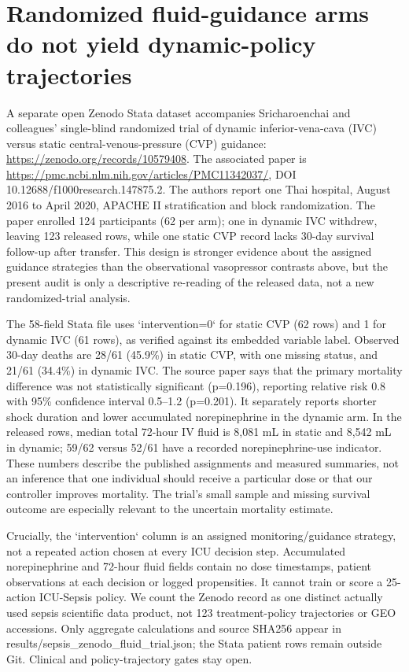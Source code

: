 \section{Randomized fluid-guidance arms do not yield dynamic-policy trajectories}
A separate open Zenodo Stata dataset accompanies Sricharoenchai and colleagues' single-blind randomized trial of dynamic inferior-vena-cava (IVC) versus static central-venous-pressure (CVP) guidance: \url{https://zenodo.org/records/10579408}. The associated paper is \url{https://pmc.ncbi.nlm.nih.gov/articles/PMC11342037/}, DOI 10.12688/f1000research.147875.2. The authors report one Thai hospital, August 2016 to April 2020, APACHE II stratification and block randomization. The paper enrolled 124 participants (62 per arm); one in dynamic IVC withdrew, leaving 123 released rows, while one static CVP record lacks 30-day survival follow-up after transfer. This design is stronger evidence about the assigned guidance strategies than the observational vasopressor contrasts above, but the present audit is only a descriptive re-reading of the released data, not a new randomized-trial analysis.

The 58-field Stata file uses `intervention=0` for static CVP (62 rows) and 1 for dynamic IVC (61 rows), as verified against its embedded variable label. Observed 30-day deaths are 28/61 (45.9\%) in static CVP, with one missing status, and 21/61 (34.4\%) in dynamic IVC. The source paper says that the primary mortality difference was not statistically significant (p=0.196), reporting relative risk 0.8 with 95\% confidence interval 0.5--1.2 (p=0.201). It separately reports shorter shock duration and lower accumulated norepinephrine in the dynamic arm. In the released rows, median total 72-hour IV fluid is 8,081 mL in static and 8,542 mL in dynamic; 59/62 versus 52/61 have a recorded norepinephrine-use indicator. These numbers describe the published assignments and measured summaries, not an inference that one individual should receive a particular dose or that our controller improves mortality. The trial's small sample and missing survival outcome are especially relevant to the uncertain mortality estimate.

Crucially, the `intervention` column is an assigned monitoring/guidance strategy, not a repeated action chosen at every ICU decision step. Accumulated norepinephrine and 72-hour fluid fields contain no dose timestamps, patient observations at each decision or logged propensities. It cannot train or score a 25-action ICU-Sepsis policy. We count the Zenodo record as one distinct actually used sepsis scientific data product, not 123 treatment-policy trajectories or GEO accessions. Only aggregate calculations and source SHA256 appear in results/sepsis\_zenodo\_fluid\_trial.json; the Stata patient rows remain outside Git. Clinical and policy-trajectory gates stay open.


